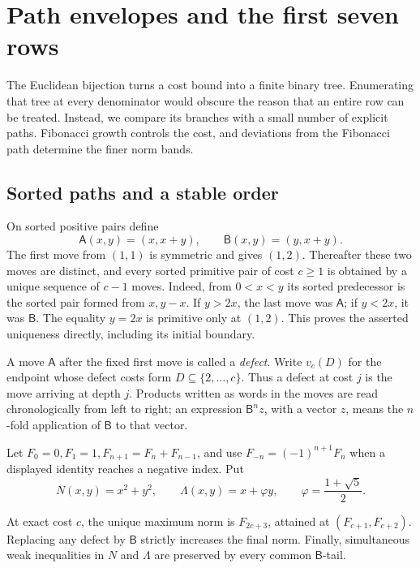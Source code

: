 \section{Path envelopes and the first seven rows}\label{sec:early-rows}

The Euclidean bijection turns a cost bound into a finite binary tree.
Enumerating that tree at every denominator would obscure the reason that
an entire row can be treated. Instead, we compare its branches with a
small number of explicit paths. Fibonacci growth controls the cost,
and deviations from the Fibonacci path determine the finer norm bands.

\subsection{Sorted paths and a stable order}

On sorted positive pairs define
\begin{equation}\label{eq:path-maps}
 \mathsf A(x,y)=(x,x+y),\qquad
 \mathsf B(x,y)=(y,x+y).
\end{equation}
The first move from $(1,1)$ is symmetric and gives $(1,2)$. Thereafter
these two moves are distinct, and every sorted primitive pair of cost
$c\geqslant1$ is obtained by a unique sequence of $c-1$ moves.
Indeed, from $0<x<y$ its sorted predecessor is the sorted pair formed
from $x,y-x$. If $y>2x$, the last move was $\mathsf A$; if $y<2x$,
it was $\mathsf B$. The equality $y=2x$ is primitive only at $(1,2)$.
This proves the asserted uniqueness directly, including its initial
boundary.

A move $\mathsf A$ after the fixed first move is called a \emph{defect}.
Write $v_c(D)$ for the endpoint whose defect costs form
$D\subseteq\{2,\ldots,c\}$. Thus a defect at cost $j$ is the move
arriving at depth $j$. Products written as words in the moves are read
chronologically from left to right; an expression $\mathsf B^nz$,
with a vector $z$, means the $n$-fold application of $\mathsf B$ to that vector.

Let $F_0=0,F_1=1,F_{n+1}=F_n+F_{n-1}$, and use
$F_{-n}=(-1)^{n+1}F_n$ when a displayed identity reaches a negative
index. Put
$$
 N(x,y)=x^2+y^2,\qquad
 \Lambda(x,y)=x+\varphi y,\qquad
 \varphi=\frac{1+\sqrt5}{2}.
$$

\begin{lemma}\label{lem:path-orders}
At exact cost $c$, the unique maximum norm is
$F_{2c+3}$, attained at $(F_{c+1},F_{c+2})$.
Replacing any defect by $\mathsf B$ strictly increases the final norm.
Finally, simultaneous weak inequalities in $N$ and $\Lambda$ are
preserved by every common $\mathsf B$-tail.
\end{lemma}

